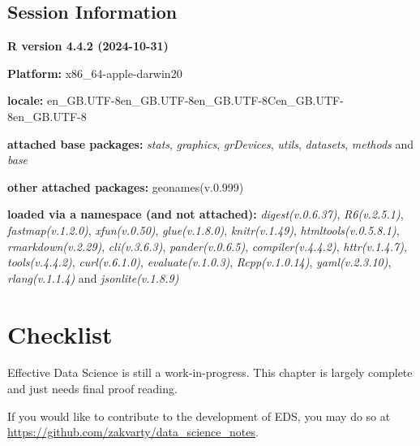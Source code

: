 \documentclass[
  letterpaper,
  DIV=11,
  numbers=noendperiod]{scrreprt}
\begin{document}
\section{Session Information}\label{session-information-5}

\textbf{R version 4.4.2 (2024-10-31)}

\textbf{Platform:} x86\_64-apple-darwin20

\textbf{locale:}
en\_GB.UTF-8\textbar\textbar en\_GB.UTF-8\textbar\textbar en\_GB.UTF-8\textbar\textbar C\textbar\textbar en\_GB.UTF-8\textbar\textbar en\_GB.UTF-8

\textbf{attached base packages:} \emph{stats}, \emph{graphics},
\emph{grDevices}, \emph{utils}, \emph{datasets}, \emph{methods} and
\emph{base}

\textbf{other attached packages:} geonames(v.0.999)

\textbf{loaded via a namespace (and not attached):}
\emph{digest(v.0.6.37)}, \emph{R6(v.2.5.1)}, \emph{fastmap(v.1.2.0)},
\emph{xfun(v.0.50)}, \emph{glue(v.1.8.0)}, \emph{knitr(v.1.49)},
\emph{htmltools(v.0.5.8.1)}, \emph{rmarkdown(v.2.29)},
\emph{cli(v.3.6.3)}, \emph{pander(v.0.6.5)}, \emph{compiler(v.4.4.2)},
\emph{httr(v.1.4.7)}, \emph{tools(v.4.4.2)}, \emph{curl(v.6.1.0)},
\emph{evaluate(v.1.0.3)}, \emph{Rcpp(v.1.0.14)}, \emph{yaml(v.2.3.10)},
\emph{rlang(v.1.1.4)} and \emph{jsonlite(v.1.8.9)}

\chapter*{Checklist}\label{data-checklist}


\begin{tcolorbox}[enhanced jigsaw, coltitle=black, opacityback=0, left=2mm, titlerule=0mm, breakable, colback=white, opacitybacktitle=0.6, colbacktitle=quarto-callout-note-color!10!white, bottomtitle=1mm, toptitle=1mm, colframe=quarto-callout-note-color-frame, bottomrule=.15mm, leftrule=.75mm, title=\textcolor{quarto-callout-note-color}{\faInfo}\hspace{0.5em}{Note}, toprule=.15mm, arc=.35mm, rightrule=.15mm]

Effective Data Science is still a work-in-progress. This chapter is
largely complete and just needs final proof reading.

If you would like to contribute to the development of EDS, you may do so
at \url{https://github.com/zakvarty/data_science_notes}.

\end{tcolorbox}
\end{document}
